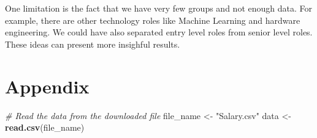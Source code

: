 \documentclass[
]{article}
\newenvironment{Shaded}{\begin{snugshade}}{\end{snugshade}}
\newcommand{\CommentTok}[1]{\textcolor[rgb]{0.56,0.35,0.01}{\textit{#1}}}
\newcommand{\FunctionTok}[1]{\textcolor[rgb]{0.13,0.29,0.53}{\textbf{#1}}}
\newcommand{\NormalTok}[1]{#1}
\newcommand{\OtherTok}[1]{\textcolor[rgb]{0.56,0.35,0.01}{#1}}
\newcommand{\StringTok}[1]{\textcolor[rgb]{0.31,0.60,0.02}{#1}}
\begin{document}
One limitation is the fact that we have very few groups and not enough
data. For example, there are other technology roles like Machine
Learning and hardware engineering. We could have also separated entry
level roles from senior level roles. These ideas can present more
insighful results.

\newpage

\section{Appendix}\label{appendix}

\begin{Shaded}
\begin{Highlighting}[]
\CommentTok{\# Read the data from the downloaded file}
\NormalTok{file\_name }\OtherTok{\textless{}{-}} \StringTok{"Salary.csv"}
\NormalTok{data }\OtherTok{\textless{}{-}} \FunctionTok{read.csv}\NormalTok{(file\_name)}
\end{Highlighting}
\end{Shaded}
\end{document}
